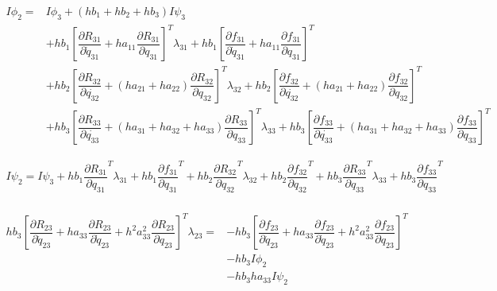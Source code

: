\documentclass[10pt,letter]{book}
\newcommand{\pd}[2]{\dfrac{\partial #1}{\partial #2}}
\begin{document}
     \begin{equation}
       \begin{split}
         I \phi_2 =  & I \phi_3 + (hb_1 + hb_2 + hb_3) I \psi_3  \\ 
         & + hb_1 \left[ \pd{R_{31}}{\dot{q}_{31}} + ha_{11} \pd{R_{31}}{q_{31}}  \right]^T \lambda_{31} + hb_1 \left[ \pd{f_{31}}{\dot{q}_{31}} + ha_{11} \pd{f_{31}}{{q}_{31}} \right]^T \\
         & + hb_2 \left[ \pd{R_{32}}{\dot{q_{32}}} + (ha_{21} + ha_{22}) \pd{R_{32}}{q_{32}} \right]^T \lambda_{32} + hb_2 \left[ \pd{f_{32}}{\dot{q_{32}}} + (ha_{21} + ha_{22}) \pd{f_{32}}{q_{32}} \right]^T \\               
         & + hb_3 \left[ \pd{R_{33}}{\dot{q_{33}}} + (ha_{31} + ha_{32} + ha_{33}) \pd{R_{33}}{q_{33}} \right]^T \lambda_{33} + hb_3 \left[ \pd{f_{33}}{\dot{q_{33}}} + (ha_{31} + ha_{32} + ha_{33}) \pd{f_{33}}{q_{33}} \right]^T
       \end{split}
     \end{equation}

     \begin{equation}
       \begin{split}
         I \psi_2 = I \psi_3 + hb_1 \pd{R_{31}}{q_{31}}^T \lambda_{31} + hb_1 \pd{f_{31}}{q_{31}}^T + hb_2 \pd{R_{32}}{q_{32}}^T \lambda_{32} + hb_2 \pd{f_{32}}{q_{32}}^T + hb_3 \pd{R_{33}}{q_{33}}^T \lambda_{33} + hb_3 \pd{f_{33}}{q_{33}}^T \\
       \end{split}
     \end{equation}

     \begin{equation}
       \begin{split}
         hb_3\left[\pd{R_{23}}{\ddot{q}_{23}} + ha_{33}\pd{R_{23}}{\dot{q}_{23}} + h^2a_{33}^2 \pd{R_{23}}{{q}_{23}} \right]^T \lambda_{23} = & - hb_3 \left[\pd{f_{23}}{\ddot{q}_{23}} + ha_{33}\pd{f_{23}}{\dot{q}_{23}} + h^2a_{33}^2 \pd{f_{23}}{{q}_{23}} \right]^T \\ 
         & - hb_3 I \phi_2 \\ 
         & - hb_3ha_{33} I  \psi_2
       \end{split}
     \end{equation}
\end{document}

